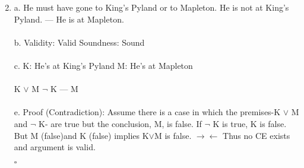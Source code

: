 \documentclass[]{article}
\begin{document}
\begin{enumerate}
    \setcounter{enumi}{1}
    \item a.
    \newline He must have gone to King's Pyland or to Mapleton.
    \newline
    He is not at King's Pyland.
    \newline
    ---
    \newline
    He is at Mapleton.
    \\\\b.
    Validity: Valid
    \newline
    Soundness: Sound
    \\\\c.
    \newline K: He's at King's Pyland
    \newline M: He's at Mapleton
    \\\\ K $\lor$ M
    \newline $\neg$ K
    \newline ---
    \newline M
    \\\\e.
    \newline Proof (Contradiction):
    \newline Assume there is a case in which the premises-K $\lor$ M and $\neg$ K- are true but the conclusion, M, is false. If $\neg$ K is true, K is false. But M (false)and K (false) implies K$\lor$M is false. $\to\gets$ Thus no CE exists and argument is valid.
    \begin{flushright}
    $\square$
    \end{flushright}
    
    
    


\end{enumerate}
\end{document}
